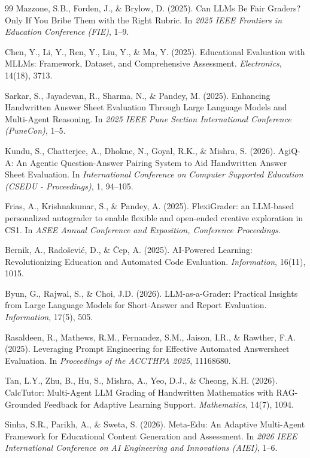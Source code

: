 \documentclass[11pt,a4paper]{article}
\begin{document}
\begin{thebibliography}{99}
Mazzone, S.B., Forden, J., \& Brylow, D. (2025). Can LLMs Be Fair Graders? Only If You Bribe Them with the Right Rubric. In \textit{2025 IEEE Frontiers in Education Conference (FIE)}, 1--9.

Chen, Y., Li, Y., Ren, Y., Liu, Y., \& Ma, Y. (2025). Educational Evaluation with MLLMs: Framework, Dataset, and Comprehensive Assessment. \textit{Electronics}, 14(18), 3713.

Sarkar, S., Jayadevan, R., Sharma, N., \& Pandey, M. (2025). Enhancing Handwritten Answer Sheet Evaluation Through Large Language Models and Multi-Agent Reasoning. In \textit{2025 IEEE Pune Section International Conference (PuneCon)}, 1--5.

Kundu, S., Chatterjee, A., Dhokne, N., Goyal, R.K., \& Mishra, S. (2026). AgiQ-A: An Agentic Question-Answer Pairing System to Aid Handwritten Answer Sheet Evaluation. In \textit{International Conference on Computer Supported Education (CSEDU - Proceedings)}, 1, 94--105.

Frias, A., Krishnakumar, S., \& Pandey, A. (2025). FlexiGrader: an LLM-based personalized autograder to enable flexible and open-ended creative exploration in CS1. In \textit{ASEE Annual Conference and Exposition, Conference Proceedings}.

Bernik, A., Radošević, D., \& Čep, A. (2025). AI-Powered Learning: Revolutionizing Education and Automated Code Evaluation. \textit{Information}, 16(11), 1015.

Byun, G., Rajwal, S., \& Choi, J.D. (2026). LLM-as-a-Grader: Practical Insights from Large Language Models for Short-Answer and Report Evaluation. \textit{Information}, 17(5), 505.

Rasaldeen, R., Mathews, R.M., Fernandez, S.M., Jaison, I.R., \& Rawther, F.A. (2025). Leveraging Prompt Engineering for Effective Automated Answersheet Evaluation. In \textit{Proceedings of the ACCTHPA 2025}, 11168680.

Tan, L.Y., Zhu, B., Hu, S., Mishra, A., Yeo, D.J., \& Cheong, K.H. (2026). CalcTutor: Multi-Agent LLM Grading of Handwritten Mathematics with RAG-Grounded Feedback for Adaptive Learning Support. \textit{Mathematics}, 14(7), 1094.

Sinha, S.R., Parikh, A., \& Sweta, S. (2026). Meta-Edu: An Adaptive Multi-Agent Framework for Educational Content Generation and Assessment. In \textit{2026 IEEE International Conference on AI Engineering and Innovations (AIEI)}, 1--6.


\end{thebibliography}
\end{document}
